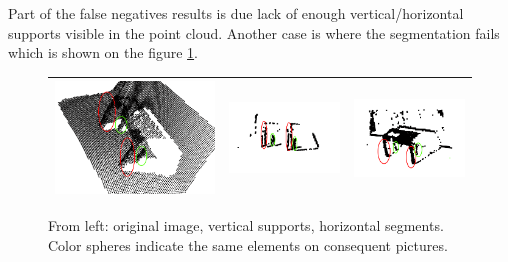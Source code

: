 \documentclass[12pt,oneside]{amsart}
\begin{document}
Part of the false negatives results is due lack of enough vertical/horizontal supports visible in the point cloud. Another case is where the segmentation fails which is shown on the figure \ref{fig:fail}.
\begin{figure}
  \begin{center}
    \begin{tabular}{|c|c|c|}
    \hline
      \includegraphics[scale=0.3]{images/fail} & \includegraphics[scale=0.3]{images/failVer} & \includegraphics[scale=0.3]{images/failHor} \\
    \hline
    \end{tabular}
    \caption{From left: original image, vertical supports, horizontal segments. Color spheres indicate the same elements on consequent pictures.}
    \label{fig:fail}
  \end{center}
\end{figure}
\end{document}
